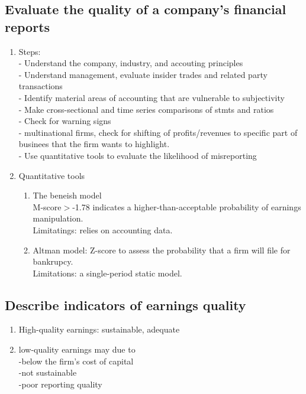 \documentclass{article}
\newcommand{\be}{\begin{enumerate}}
\newcommand{\ee}{\end{enumerate}}
\begin{document}
\subsection{Evaluate the quality of a company's financial reports}
\be
    \item Steps:
        \\- Understand the company, industry, and accouting principles
        \\- Understand management, evaluate insider trades and related party transactions
        \\- Identify material areas of accounting that are vulnerable to subjectivity
        \\- Make cross-sectional and time series comparisons of stmts and ratios
        \\- Check for warning signs
        \\- multinational firms, check for shifting of profits/revenues to specific part
        of businees that the firm wants to highlight.
        \\- Use quantitative tools to evaluate the likelihood of misreporting
    \item Quantitative tools
        \be
            \item The beneish model
                \\ M-score$>$-1.78 indicates a higher-than-acceptable probability
                of earnings manipulation.
                \\ Limitatings: relies on accounting data.
            \item Altman model: Z-score to assess the probability that a firm
                will file for bankrupcy.
                \\ Limitations: a single-period static model.
        \ee
\ee
\subsection{Describe indicators of earnings quality}
\be
    \item High-quality earnings: sustainable, adequate
    \item low-quality earnings may due to
        \\-below the firm's cost of capital
        \\-not sustainable
        \\-poor reporting quality
\ee
\end{document}
